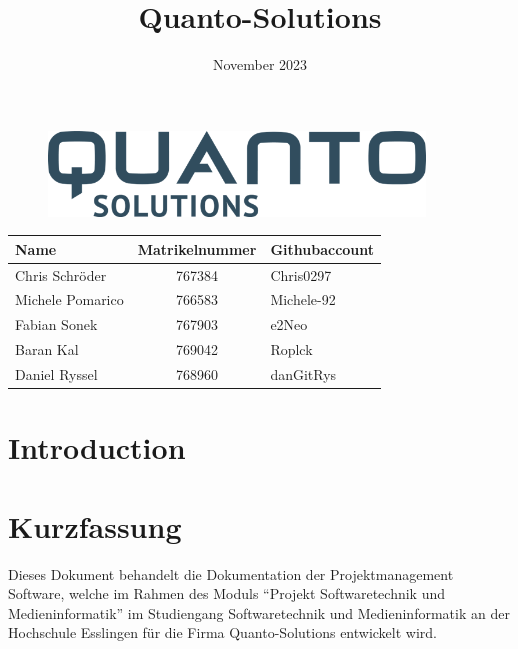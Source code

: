 \documentclass{article}
\begin{document}
\begin{figure}[h]
    \centering
    \includegraphics[width=10cm]{images/Logo.png}
\end{figure}

\title{Quanto-Solutions}

\date{November 2023}

\renewcommand{\listfigurename}{Abbildungsverzeichnis}

\maketitle

\begin{table}[h]
    \centering

    \begin{tabular}{|p{3cm}|c|p{3cm}|}
        \hline
        \textbf{Name}    & \textbf{Matrikelnummer} & \textbf{Githubaccount} \\
        \hline
        Chris Schröder   & 767384                  & Chris0297              \\
        Michele Pomarico & 766583                  & Michele-92             \\
        Fabian Sonek     & 767903                  & e2Neo                  \\
        Baran Kal        & 769042                  & Roplck                 \\
        Daniel Ryssel    & 768960                  & danGitRys              \\
        \hline
    \end{tabular}
\end{table}

\newpage

\tableofcontents  %

\newpage
\listoffigures  %
\newpage

\section{Introduction}

\section{Kurzfassung}
Dieses Dokument behandelt die Dokumentation der Projektmanagement Software,
welche im Rahmen des Moduls “Projekt Softwaretechnik und Medieninformatik” im
Studiengang Softwaretechnik und Medieninformatik an der Hochschule Esslingen
für die Firma Quanto-Solutions entwickelt wird.
\end{document}
